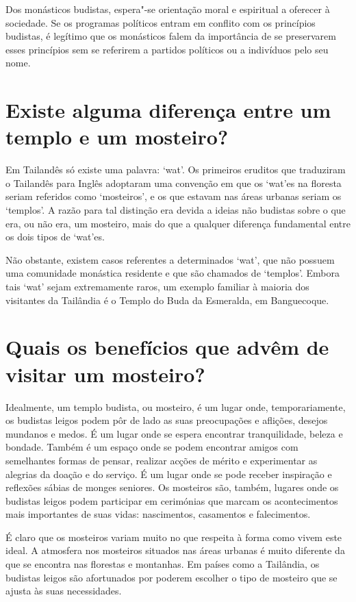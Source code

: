 Dos monásticos budistas, espera"-se orientação moral e espiritual a
oferecer à sociedade. Se os programas políticos entram em conflito com
os princípios budistas, é legítimo que os monásticos falem da importância
de se preservarem esses princípios sem se referirem a partidos
políticos ou a indivíduos pelo seu nome.

\section{Existe alguma diferença entre um templo e um mosteiro?}

Em Tailandês só existe uma palavra: `wat'. Os primeiros eruditos que
traduziram o Tailandês para Inglês adoptaram uma convenção em que os
`wat'es na floresta seriam referidos como `mosteiros', e os que
estavam nas áreas urbanas seriam os `templos'. A razão para tal
distinção era devida a ideias não budistas sobre o que era, ou não era,
um mosteiro, mais do que a qualquer diferença fundamental entre os dois
tipos de `wat'es.

Não obstante, existem casos referentes a determinados `wat', que não
possuem uma comunidade monástica residente e que são chamados de
`templos'. Embora tais `wat' sejam extremamente raros, um exemplo
familiar à maioria dos visitantes da Tailândia é o Templo do Buda da
Esmeralda, em Banguecoque.

\section{Quais os benefícios que advêm de visitar um mosteiro?}

Idealmente, um templo budista, ou mosteiro, é um lugar onde,
temporariamente, os budistas leigos podem pôr de lado as suas
preocupações e aflições, desejos mundanos e medos. É um lugar onde se
espera encontrar tranquilidade, beleza e bondade. Também é um espaço
onde se podem encontrar amigos com semelhantes formas de pensar,
realizar acções de mérito e experimentar as alegrias da doação e do
serviço. É um lugar onde se pode receber inspiração e reflexões sábias
de monges seniores. Os mosteiros são, também, lugares onde os budistas
leigos podem participar em cerimónias que marcam os acontecimentos mais
importantes de suas vidas: nascimentos, casamentos e falecimentos.

É claro que os mosteiros variam muito no que respeita à forma como
vivem este ideal. A atmosfera nos mosteiros situados nas áreas urbanas é
muito diferente da que se encontra nas florestas e montanhas. Em países
como a Tailândia, os budistas leigos são afortunados por poderem
escolher o tipo de mosteiro que se ajusta às suas necessidades.

